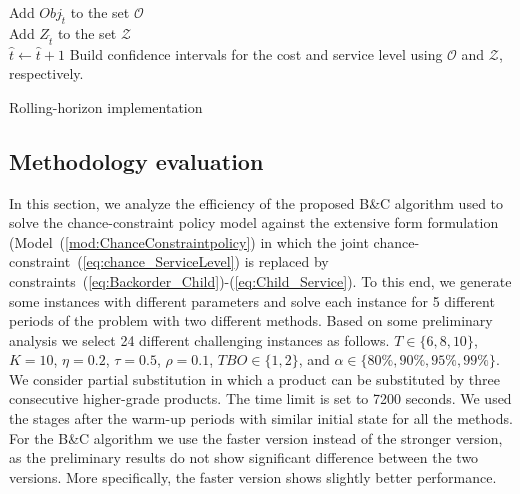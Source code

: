 \documentclass[11pt]{article}
\newcommand{\ti}{t} %
\newcommand{\Ti}{T}
\newcommand{\Ka}{K}
\newcommand{\Bi}{B} %
\newcommand{\Vi}{v} %
\newcommand{\tAct}{\hat{\ti}} %
\begin{document}
\begin{algorithm}[H]
{  Add $Obj_{\tAct}$ to the set $\mathcal{O}$ \\
  Add $Z_{\tAct}$ to the set $\mathcal{Z}$ \\
  $\tAct \gets \tAct+1$ }
  Build confidence intervals for the cost and service level using $\mathcal{O}$ and $\mathcal{Z}$, respectively.
  \caption{Rolling-horizon implementation}
  \label{Al:PolicyEvaluation}
\end{algorithm}



\subsection{Methodology evaluation}
In this section, we analyze the efficiency of the proposed B\&C algorithm used to solve the chance-constraint policy model against the extensive form formulation (Model~(\ref{mod:ChanceConstraintpolicy}) in which the joint chance-constraint~(\ref{eq:chance_ServiceLevel}) is replaced by constraints~(\ref{eq:Backorder_Child})-(\ref{eq:Child_Service}). To this end, we generate some instances with different parameters and  solve each instance for 5 different periods of the problem with two different methods. Based on some preliminary analysis we select 24 different challenging instances as follows. $\Ti \in \{  6, 8 , 10\}$, $\Ka = 10$,
$\eta =  0.2 $,
$\tau = 0.5 $,
$\rho = 0.1$,
$ TBO \in \{1, 2\} $, and
$ \alpha \in \{80\%, 90\%, 95\%, 99\% \} $. We consider partial substitution in which a product can be substituted by three consecutive higher-grade products. The time limit is set to 7200 seconds. We used the stages after the warm-up periods with similar initial state for all the methods. For the B\&C algorithm we use the faster version instead of the stronger version, as the preliminary results do not show significant difference between the two versions. More specifically, the faster version shows slightly better performance. 

  
\end{document}
